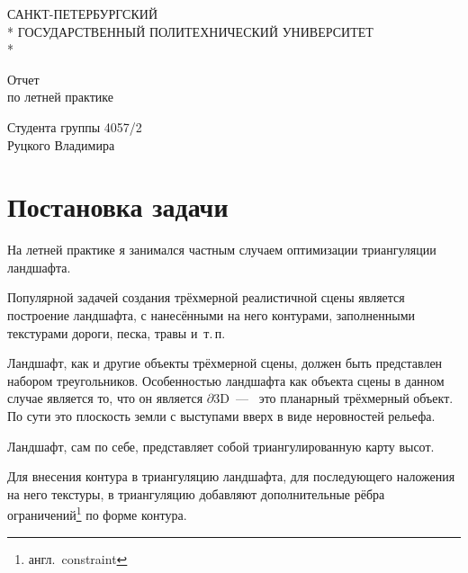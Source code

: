 \documentclass[a4paper,10pt,titlepage]{report}
\begin{document}
\begin{titlepage}
\newpage

\begin{center}
САНКТ-ПЕТЕРБУРГСКИЙ \\*
ГОСУДАРСТВЕННЫЙ ПОЛИТЕХНИЧЕСКИЙ УНИВЕРСИТЕТ \\*
\hrulefill
\end{center}


\vspace{8em}

\begin{center}
\Large Отчет \\ по летней практике
\end{center}

\vspace{8.5em}

\begin{center}
Студента группы 4057/2 \\ Руцкого Владимира
\end{center}

\vspace{\fill}

\end{titlepage}
\pagebreak


\section*{Постановка задачи}
На летней практике я занимался частным случаем оптимизации триангуляции ландшафта.

Популярной задачей создания трёхмерной реалистичной сцены является построение ландшафта, 
с нанесёнными на него контурами, заполненными текстурами дороги, песка, травы и~т.\,п.

Ландшафт, как и другие объекты трёхмерной сцены, должен быть представлен набором треугольников.
Особенностью ландшафта как объекта сцены в данном случае является то, что он является $\partial 3\mathrm{D}$~---~
это планарный трёхмерный объект.
По сути это плоскость земли с выступами вверх в виде неровностей рельефа.

Ландшафт, сам по себе, представляет собой триангулированную карту высот.

Для внесения контура в триангуляцию ландшафта, для последующего наложения на него текстуры,
в триангуляцию добавляют дополнительные рёбра ограничений\footnote{англ.~constraint} по форме контура.
\end{document}

